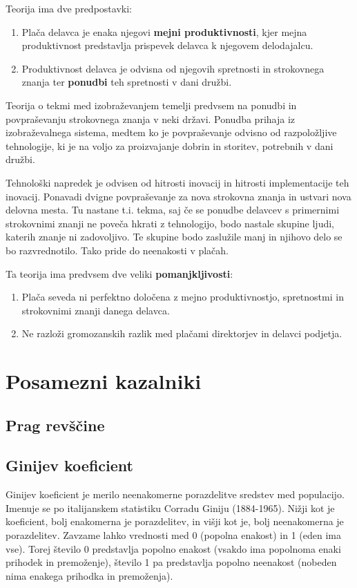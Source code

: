 \documentclass[a4paper,12 pt]{article}
\begin{document}
Teorija ima dve predpostavki:
\begin{enumerate}
\item Plača delavca je enaka njegovi \textbf{mejni produktivnosti}, kjer mejna produktivnost predstavlja prispevek delavca k njegovem delodajalcu.
\item Produktivnost delavca je odvisna od njegovih spretnosti in strokovnega znanja ter \textbf{ponudbi} teh spretnosti v dani družbi.
\end{enumerate}

Teorija o tekmi med izobraževanjem temelji predvsem na ponudbi in povpraševanju strokovnega znanja v neki državi. Ponudba prihaja iz izobraževalnega sistema, medtem ko je povpraševanje odvisno od razpoložljive tehnologije, ki je na voljo za proizvajanje dobrin in storitev, potrebnih v dani družbi.

Tehnološki napredek je odvisen od hitrosti inovacij in hitrosti implementacije teh inovacij. Ponavadi dvigne povpraševanje za nova strokovna znanja in ustvari nova delovna mesta. Tu nastane t.i. tekma, saj če se ponudbe delavcev s primernimi strokovnimi znanji ne poveča hkrati z tehnologijo, bodo nastale skupine ljudi, katerih znanje ni zadovoljivo. Te skupine bodo zaslužile manj in njihovo delo se bo razvrednotilo. Tako pride do neenakosti v plačah.

Ta teorija ima predvsem dve veliki \textbf{pomanjkljivosti}:
\begin{enumerate}
\item Plača seveda ni perfektno določena z mejno produktivnostjo, spretnostmi in strokovnimi znanji danega delavca.
\item Ne razloži gromozanskih razlik med plačami direktorjev in delavci podjetja.
\end{enumerate}


\newpage

\section[Posamezni kazalniki]{Posamezni kazalniki}
\subsection[Prag revščine]{Prag revščine}

\subsection[Ginijev koeficient]{Ginijev koeficient}
Ginijev koeficient je merilo neenakomerne porazdelitve sredstev med populacijo. Imenuje se po italijanskem statistiku Corradu Giniju (1884-1965). Nižji kot je koeficient,  bolj enakomerna je porazdelitev,  in višji kot je,  bolj neenakomerna je porazdelitev. Zavzame lahko vrednosti med 0 (popolna enakost) in 1 (eden ima vse). Torej število 0 predstavlja popolno enakost (vsakdo ima popolnoma enaki prihodek in premoženje), število 1 pa predstavlja popolno neenakost (nobeden nima enakega prihodka in premoženja). 
\end{document}
